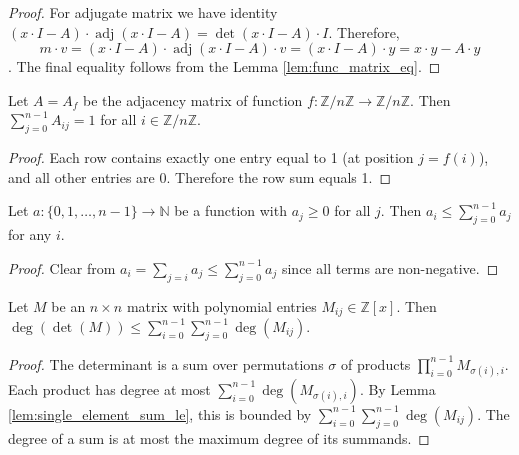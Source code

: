 \begin{proof}
For adjugate matrix we have identity 
$(x\cdot I - A)\cdot \operatorname{adj} (x\cdot I - A) = \det(x\cdot I - A)\cdot I$.
Therefore,
$$m\cdot v = (x\cdot I - A)\cdot \operatorname{adj} (x\cdot I - A)\cdot v 
= (x\cdot I - A)\cdot y = x\cdot y - A\cdot y$$.
The final equality follows from the Lemma \ref{lem:func_matrix_eq}.
\end{proof}

\begin{lemma}
\label{lem:func_matrix_row_sum}
Let $A=A_f$ be the adjacency matrix of function $f: \mathbb{Z}/n\mathbb{Z} \to \mathbb{Z}/n\mathbb{Z}$.
Then $\sum_{j=0}^{n-1} A_{ij} = 1$ for all $i\in \mathbb{Z}/n\mathbb{Z}$.
\end{lemma}

\begin{proof}
Each row contains exactly one entry equal to 1 (at position $j = f(i)$), and all other entries are 0.
Therefore the row sum equals 1.
\end{proof}

\begin{lemma}
\label{lem:single_element_sum_le}
\leanok
Let $a: \{0,1,\ldots,n-1\} \to \mathbb{N}$ be a function with $a_j \geq 0$ for all $j$. 
Then $a_i \leq \sum_{j=0}^{n-1} a_j$ for any $i$.
\end{lemma}

\begin{proof}
Clear from $a_i = \sum_{j=i} a_j \leq \sum_{j=0}^{n-1} a_j$ since all terms are non-negative.
\end{proof}

\begin{lemma}
\label{lem:det_degree_le_sum_degrees}
\leanok
{}
Let $M$ be an $n \times n$ matrix with polynomial entries $M_{ij} \in \mathbb{Z}[x]$.
Then $\deg(\det(M)) \leq \sum_{i=0}^{n-1} \sum_{j=0}^{n-1} \deg(M_{ij})$.
\end{lemma}

\begin{proof}
The determinant is a sum over permutations $\sigma$ of products $\prod_{i=0}^{n-1} M_{\sigma(i),i}$.
Each product has degree at most $\sum_{i=0}^{n-1} \deg(M_{\sigma(i),i})$.
By Lemma \ref{lem:single_element_sum_le}, this is bounded by $\sum_{i=0}^{n-1} \sum_{j=0}^{n-1} \deg(M_{ij})$.
The degree of a sum is at most the maximum degree of its summands.
\end{proof}

